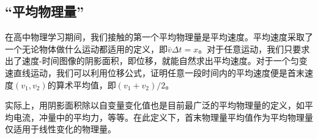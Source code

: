 \subsection{“平均物理量”}
在高中物理学习期间，我们接触的第一个平均物理量是平均速度。平均速度采取了一个无论物体做什么运动都适用的定义，即$\bar v\Delta t=x$。对于任意运动，我们只要求出了速度-时间图像的阴影面积，即位移，就能自然求出平均速度。对于一个匀变速直线运动，我们可以利用位移公式，证明任意一段时间内的平均速度便是首末速度$(v_1,v_2)$的算术平均值，即$(v_1+v_2)/2$。

实际上，用阴影面积除以自变量变化值也是目前最广泛的平均物理量的定义，如平均电流，冲量中的平均力，等等。在此定义下，首末物理量平均值作为平均物理量仅适用于线性变化的物理量。
